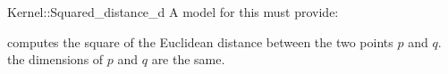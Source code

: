 \begin{ccRefFunctionObjectConcept}{Kernel::Squared_distance_d}
A model for this must provide:


{computes the square of the Euclidean distance between the two 
points $p$ and $q$.
\ccPrecond the dimensions of $p$ and $q$ are the same.}

\end{ccRefFunctionObjectConcept}
